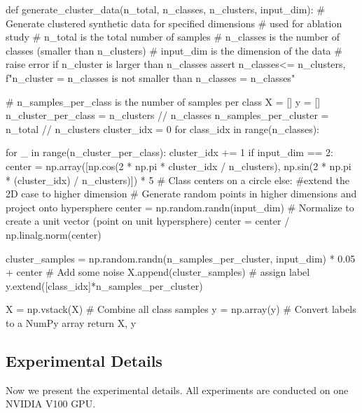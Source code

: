 \documentclass{article}
\newcommand{\1}{^{(1)}}
\newcommand{\2}{^{(2)}}
\begin{document}
\begin{python}[language=Python, caption=]

def generate_cluster_data(n_total, n_classes, n_clusters, input_dim):
    # Generate clustered synthetic data for specified dimensions
    # used for ablation study
    # n_total is the total number of samples
    # n_classes is the number of classes (smaller than n_clusters)
    # input_dim is the dimension of the data
    # raise error if n_cluster is larger than n_classes
    assert n_classes<= n_clusters, f"n_cluster = {n_classes} is not smaller than n_classes = {n_classes}"
    
    # n_samples_per_class is the number of samples per class
    X = []
    y = []
    n_cluster_per_class = n_clusters // n_classes
    n_samples_per_cluster = n_total // n_clusters
    cluster_idx = 0
    for class_idx in range(n_classes):

        for _ in range(n_cluster_per_class):
            cluster_idx += 1
            if input_dim == 2:
                center = np.array([np.cos(2 * np.pi * cluster_idx / n_clusters), np.sin(2 * np.pi * (cluster_idx) / n_clusters)]) * 5  # Class centers on a circle
            else:
                #extend the 2D case to higher dimension
                # Generate random points in higher dimensions and project onto hypersphere
                center = np.random.randn(input_dim)
                # Normalize to create a unit vector (point on unit hypersphere)
                center = center / np.linalg.norm(center)

            cluster_samples = np.random.randn(n_samples_per_cluster, input_dim) * 0.05 + center  # Add some noise
            X.append(cluster_samples)
            # assign label
            y.extend([class_idx]*n_samples_per_cluster)

    X = np.vstack(X)  # Combine all class samples
    y = np.array(y)    # Convert labels to a NumPy array
    return X, y

\end{python}




\subsection{Experimental Details}
\label{appendix_experimental_details}

Now we present the experimental details. 
All experiments are conducted on one NVIDIA V100 GPU.
\end{document}
